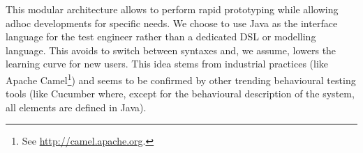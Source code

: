 This modular architecture allows to perform rapid prototyping while allowing adhoc developments for specific needs. We choose to use Java as the interface language for the test engineer rather than a dedicated DSL or modelling language. This avoids to switch between syntaxes and, we assume, lowers the learning curve for new users. This idea stems from industrial practices (like Apache Camel\footnote{See \url{http://camel.apache.org}.}) and seems to be confirmed by other trending behavioural testing tools (like Cucumber \cite{cucumber} where, except for the behavioural description of the system, all elements are defined in Java).


